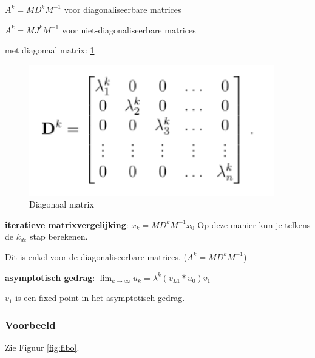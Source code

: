 \documentclass[a4paper]{article}
\begin{document}
$A^k = M D^k M^{-1}$ voor diagonaliseerbare matrices

$A^k = M J^k M^{-1}$ voor niet-diagonaliseerbare matrices

met diagonaal matrix: \ref{fig:diag}

\begin{figure}[htbp!]
	\begin{center}
		\includegraphics[width=0.95\textwidth]{./images/diag.png}
	\end{center}
	\caption{Diagonaal matrix}
	\label{fig:diag}
\end{figure}

\textbf{iteratieve matrixvergelijking}: $x_k = M D^k M^{-1} x_0$ Op deze manier kun je telkens de $k_{de}$ stap berekenen.

Dit is enkel voor de diagonaliseerbare matrices. ($A^k = M D^k M^{-1}$)

\textbf{asymptotisch gedrag}: $\lim_{k \to \infty} u_k = \lambda^k (v_{L1} * u_0) v_1$

$v_1$ is een fixed point in het asymptotisch gedrag.

\subsubsection{Voorbeeld}

Zie Figuur \ref{fig:fibo}.
\end{document}
